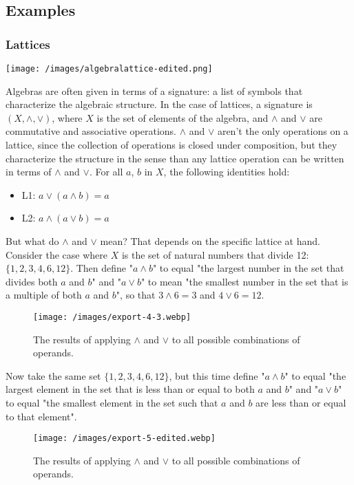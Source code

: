 \documentclass{article} %
\begin{document}
\subsection{Examples}

\subsubsection{Lattices}

\texttt{[image: /images/algebralattice-edited.png]}

Algebras are often given in terms of a signature: a list of symbols that characterize the algebraic structure. In the case of lattices, a signature is $ (X, \land, \lor) $, where $ X $ is the set of elements of the algebra, and $ \land$ and $ \lor $ are commutative and associative operations. $ \land $ and $ \lor $ aren't the only operations on a lattice, since the collection of operations is closed under composition, but they characterize the structure in the sense than any lattice operation can be written in terms of $ \land $  and $ \lor$. For all $ a$, $ b$ in $ X$, the following identities hold:

\begin{itemize}
\item{L1: $ a \lor (a \land b) = a$}
\item{L2: $ a\land(a\lor b) = a$}
\end{itemize}

But what do $ \land$ and $ \lor$ mean? That depends on the specific lattice at hand. Consider the case where $ X$ is the set of natural numbers that divide 12: $ \{1, 2, 3, 4, 6, 12\}$. Then define "$ a \land b$" to equal "the largest number in the set that divides both $ a$ and $ b$" and "$ a \lor b$" to mean "the smallest number in the set that is a multiple of both $ a$ and $ b$", so that $ 3 \land 6 = 3$ and $ 4 \lor 6 = 12$.

\begin{figure}
\texttt{[image: /images/export-4-3.webp]}
\caption{The results of applying $ \land$ and $ \lor$ to all possible combinations of operands.}
\end{figure}

Now take the same set $ \{1, 2, 3, 4, 6, 12\}$, but this time define "$ a \land b$" to equal "the largest element in the set that is less than or equal to both $ a$ and $ b$" and "$ a \lor b$" to equal "the smallest element in the set such that $ a$ and $ b$ are less than or equal to that element".

\begin{figure}
\texttt{[image: /images/export-5-edited.webp]}
\caption{The results of applying $ \land$ and $ \lor$ to all possible combinations of operands.}
\end{figure}
\end{document}
